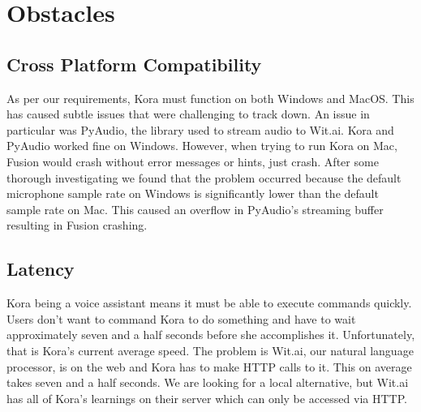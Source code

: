 \documentclass[onecolumn, draftclsnofoot,10pt, compsoc]{IEEEtran}
\begin{document}
\section{Obstacles}

    \subsection{Cross Platform Compatibility}
    As per our requirements, Kora must function on both Windows and MacOS.
    This has caused subtle issues that were challenging to track down.
    An issue in particular was PyAudio, the library used to stream audio to Wit.ai.
    Kora and PyAudio worked fine on Windows.
    However, when trying to run Kora on Mac, Fusion would crash without error messages or hints, just crash.
    After some thorough investigating we found that the problem occurred because the default microphone sample rate on Windows is significantly lower than the default sample rate on Mac.
    This caused an overflow in PyAudio's streaming buffer resulting in Fusion crashing.
    
    \subsection{Latency}
    Kora being a voice assistant means it must be able to execute commands quickly.
    Users don't want to command Kora to do something and have to wait approximately seven and a half seconds before she accomplishes it.
    Unfortunately, that is Kora's current average speed.
    The problem is Wit.ai, our natural language processor, is on the web and Kora has to make HTTP calls to it.
    This on average takes seven and a half seconds.
    We are looking for a local alternative, but Wit.ai has all of Kora's learnings on their server which can only be accessed via HTTP.
    
    
\end{document}
